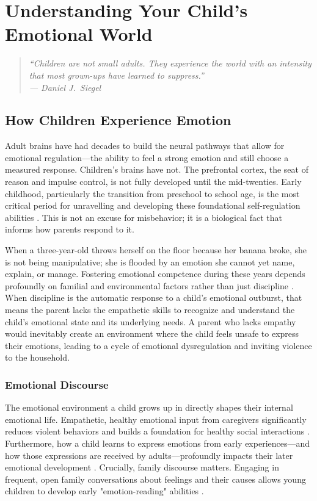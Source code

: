 \chapter{Understanding Your Child's Emotional World}

\begin{quote}
\itshape ``Children are not small adults. They experience the world with an 
intensity that most grown-ups have learned to suppress.''\\
\upshape --- Daniel J.\ Siegel
\end{quote}
\newpage
\section{How Children Experience Emotion}

Adult brains have had decades to build the neural pathways that allow for emotional regulation---the ability to feel a strong emotion and still choose a measured response. 
Children's brains have not. 
The prefrontal cortex, the seat of reason and impulse control, is not fully developed until the mid-twenties. 
Early childhood, particularly the transition from preschool to school age, is the most critical period for unravelling and developing these foundational self-regulation abilities \citep{howard2024}. 
This is not an excuse for misbehavior; it is a biological fact that informs how parents respond to it.  

When a three-year-old throws herself on the floor because her banana broke, she is not being manipulative; she is flooded by an emotion she cannot yet name, explain, or manage. 
Fostering emotional competence during these years depends profoundly on familial and environmental factors rather than just discipline \citep{aghaziarati2023}.
When discipline is the automatic response to a child's emotional outburst, that means the parent lacks the empathetic skills to recognize and understand the child's emotional state and its underlying needs.
A parent who lacks empathy would inevitably create an environment where the child feels unsafe to express their emotions, leading to a cycle of emotional dysregulation and inviting violence to the household. 

\subsection{Emotional Discourse}
The emotional environment a child grows up in directly shapes their internal emotional life. 
Empathetic, healthy emotional input from caregivers significantly reduces violent behaviors and builds a foundation for healthy social interactions \citep{lobue2022}.
Furthermore, how a child learns to express emotions from early experiences---and how those expressions are received by adults---profoundly impacts their later emotional development \citep{herman2025}. 
Crucially, family discourse matters. 
Engaging in frequent, open family conversations about feelings and their causes allows young children to develop early "emotion-reading" abilities \citep{dunn2000}.

